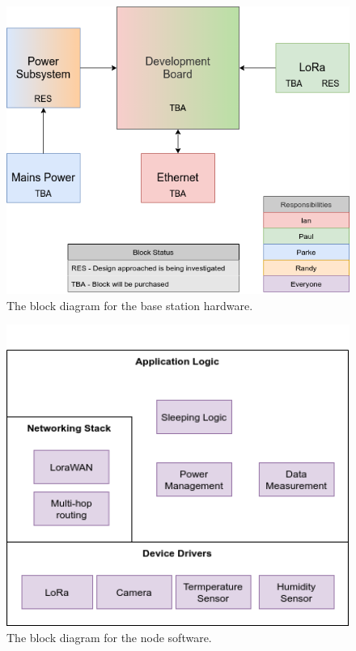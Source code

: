 \documentclass{article}
\begin{document}
\begin{figure}[H]
    \centering
    \includegraphics[width=4.6in]{"./hwBaseStationBD.png"} 
    \caption{The block diagram for the base station hardware.}
    \label{fig:hwBaseStationBD}
\end{figure}

\begin{figure}[H]
    \centering
    \includegraphics[width=4.6in]{"./swNodeBD.png"} 
    \caption{The block diagram for the node software.}
    \label{fig:swNodeBD}
\end{figure}
\end{document}

